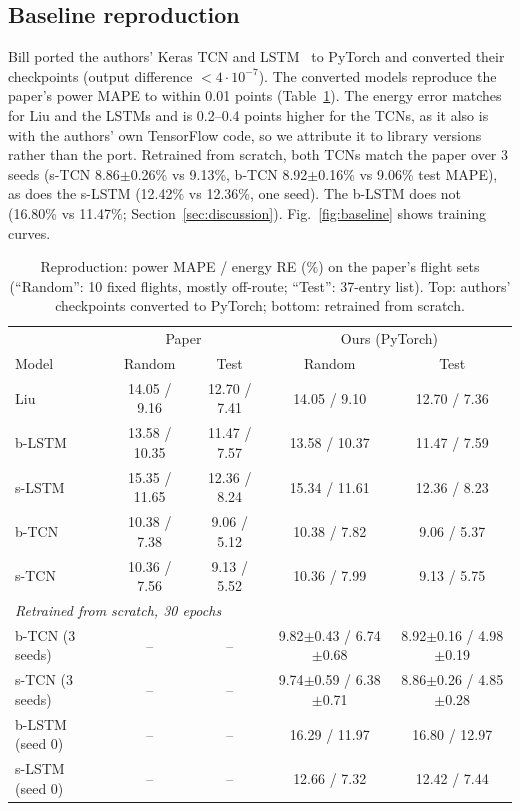 \documentclass{article}
\begin{document}
\subsection{Baseline reproduction}
Bill ported the authors' Keras TCN and LSTM~\cite{cvarcode} to PyTorch and converted their checkpoints (output
difference $<4\cdot10^{-7}$). The converted models reproduce the paper's power MAPE to within 0.01 points
(Table~\ref{tab:repro}). The energy error matches for Liu and the LSTMs and is 0.2--0.4 points higher for the
TCNs, as it also is with the authors' own TensorFlow code, so we attribute it to library versions rather than the
port. Retrained from scratch, both TCNs match the paper over 3 seeds (s-TCN 8.86$\pm$0.26\% vs 9.13\%, b-TCN
8.92$\pm$0.16\% vs 9.06\% test MAPE), as does the s-LSTM (12.42\% vs 12.36\%, one seed). The b-LSTM does not
(16.80\% vs 11.47\%; Section~\ref{sec:discussion}). Fig.~\ref{fig:baseline} shows training curves.

\begin{table}[t]
\centering
\caption{Reproduction: power MAPE / energy RE (\%) on the paper's flight sets (``Random'': 10 fixed flights, mostly
off-route; ``Test'': 37-entry list). Top: authors' checkpoints converted to PyTorch; bottom: retrained from scratch.}
\label{tab:repro}
\small
\begin{tabular}{lcccc}
\toprule
& \multicolumn{2}{c}{Paper~\cite{choudhry2021}} & \multicolumn{2}{c}{Ours (PyTorch)} \\
Model & Random & Test & Random & Test \\
\midrule
Liu & 14.05 / 9.16 & 12.70 / 7.41 & 14.05 / 9.10 & 12.70 / 7.36 \\
b-LSTM & 13.58 / 10.35 & 11.47 / 7.57 & 13.58 / 10.37 & 11.47 / 7.59 \\
s-LSTM & 15.35 / 11.65 & 12.36 / 8.24 & 15.34 / 11.61 & 12.36 / 8.23 \\
b-TCN & 10.38 / 7.38 & 9.06 / 5.12 & 10.38 / 7.82 & 9.06 / 5.37 \\
s-TCN & 10.36 / 7.56 & 9.13 / 5.52 & 10.36 / 7.99 & 9.13 / 5.75 \\
\midrule
\multicolumn{5}{l}{\emph{Retrained from scratch, 30 epochs}} \\
b-TCN (3 seeds) & -- & -- & 9.82$\pm$0.43 / 6.74$\pm$0.68 & 8.92$\pm$0.16 / 4.98$\pm$0.19 \\
s-TCN (3 seeds) & -- & -- & 9.74$\pm$0.59 / 6.38$\pm$0.71 & 8.86$\pm$0.26 / 4.85$\pm$0.28 \\
b-LSTM (seed 0) & -- & -- & 16.29 / 11.97 & 16.80 / 12.97 \\
s-LSTM (seed 0) & -- & -- & 12.66 / 7.32 & 12.42 / 7.44 \\
\bottomrule
\end{tabular}
\end{table}
\end{document}
